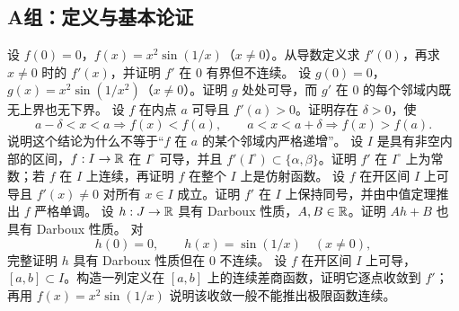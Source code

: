 \subsection*{A组：定义与基本论证}
\begin{enumerate}[label=\textbf{\thechapter.\arabic*.}]
  设 \(f(0)=0\)，\(f(x)=x^2\sin(1/x)\)（\(x\ne0\)）。从导数定义求 \(f'(0)\)，再求 \(x\ne0\) 时的 \(f'(x)\)，并证明 \(f'\) 在 \(0\) 有界但不连续。
  设 \(g(0)=0\)，\(g(x)=x^2\sin(1/x^2)\)（\(x\ne0\)）。证明 \(g\) 处处可导，而 \(g'\) 在 \(0\) 的每个邻域内既无上界也无下界。
  设 \(f\) 在内点 \(a\) 可导且 \(f'(a)>0\)。证明存在 \(\delta>0\)，使
 \[
  a-\delta<x<a\Longrightarrow f(x)<f(a),
  \qquad
  a<x<a+\delta\Longrightarrow f(x)>f(a).
 \]
说明这个结论为什么不等于“\(f\) 在 \(a\) 的某个邻域内严格递增”。
  设 \(I\) 是具有非空内部的区间，\(f:I\to\mathbb{R}\) 在 \(I^\circ\) 可导，并且 \(f'(I^\circ)\subset\{\alpha,\beta\}\)。证明 \(f'\) 在 \(I^\circ\) 上为常数；若 \(f\) 在 \(I\) 上连续，再证明 \(f\) 在整个 \(I\) 上是仿射函数。
  设 \(f\) 在开区间 \(I\) 上可导且 \(f'(x)\ne0\) 对所有 \(x\in I\) 成立。证明 \(f'\) 在 \(I\) 上保持同号，并由中值定理推出 \(f\) 严格单调。
  设 \(h:J\to\mathbb{R}\) 具有 Darboux 性质，\(A,B\in\mathbb{R}\)。证明 \(Ah+B\) 也具有 Darboux 性质。
  对
 \[
  h(0)=0,
  \qquad h(x)=\sin(1/x)\quad(x\ne0),
 \]
完整证明 \(h\) 具有 Darboux 性质但在 \(0\) 不连续。
  设 \(f\) 在开区间 \(I\) 上可导，\([a,b]\subset I\)。构造一列定义在 \([a,b]\) 上的连续差商函数，证明它逐点收敛到 \(f'\)；再用 \(f(x)=x^2\sin(1/x)\) 说明该收敛一般不能推出极限函数连续。
\end{enumerate}

